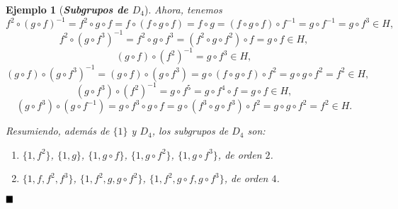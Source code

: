 \documentclass[12pt]{article}
\newtheorem{example}{Ejemplo}[theorem]
\begin{document}
\begin{example} [\textbf{\textit{Subgrupos de $D_4$}}]
Ahora, tenemos $$f^2 \circ (g \circ f)^{-1} = f^2 \circ g \circ f = f \circ (f \circ g \circ f) = f \circ g = (f \circ g \circ f) \circ f^{-1} = g \circ f^{-1} = g \circ f^3 \in H,$$ $$f^2 \circ (g \circ f^3)^{-1} = f^2 \circ g \circ f^3 = (f^2 \circ g \circ f^2) \circ f = g \circ f \in H,$$ $$(g \circ f) \circ (f^2)^{-1} = g \circ f^3 \in H,$$ $$(g \circ f) \circ (g \circ f^3)^{-1} = (g \circ f)\circ(g \circ f^3) = g \circ (f \circ g \circ f)  \circ f^2 = g \circ g \circ f^2 = f^2 \in H,$$ $$(g \circ f^3) \circ (f^2)^{-1} = g \circ f^5 = g \circ f^4 \circ f = g \circ f \in H,$$ $$(g \circ f^3) \circ (g \circ f^{-1}) = g \circ f^3 \circ g \circ f = g \circ (f^3 \circ g \circ f^3) \circ f^2 = g \circ g \circ f^2 = f^2 \in H.$$

Resumiendo, además de $\lbrace 1 \rbrace$ y $D_4$, los subgrupos de $D_4$ son: 
\begin{enumerate}
\item $\lbrace 1, f^2 \rbrace$, $\lbrace 1,g \rbrace$, $\lbrace 1, g \circ f \rbrace$, $\lbrace 1, g \circ f^2 \rbrace$, $ \lbrace 1, g \circ f^3 \rbrace$, de orden $2$.
\item $\lbrace 1,f,f^2, f^3 \rbrace$, $\lbrace 1, f^2, g, g \circ f^2 \rbrace$, $\lbrace 1, f^2, g\circ f, g \circ f^3 \rbrace$, de orden $4$. 
\end{enumerate}
\end{example}

$\hfill \blacksquare$
\end{document}

